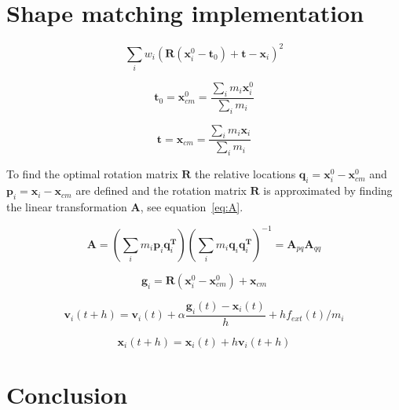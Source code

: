 \section{Shape matching implementation}

   
    \begin{equation} \label{eq:min}
        \sum_i{w_i(\mathbf{R}(\mathbf{x}_i^0 - \mathbf{t}_0) + \mathbf{t} - \mathbf{x}_i)^2}
    \end{equation}

    \begin{equation} \label{eq:com1}
        \mathbf{t}_0 = \mathbf{x}^0_{cm} = \frac{\sum_i{m_i\mathbf{x}_i^0}}{\sum_i{m_i}}
    \end{equation}

    \begin{equation} \label{eq:com2}
        \mathbf{t} = \mathbf{x}_{cm} = \frac{\sum_i{m_i\mathbf{x}_i}}{\sum_i{m_i}}
    \end{equation}

    To find the optimal rotation matrix $\mathbf{R}$ the relative locations 
    $\mathbf{q}_i = \mathbf{x}^0_i - \mathbf{x}^0_{cm}$ and 
    $\mathbf{p}_i = \mathbf{x}_i - \mathbf{x}_{cm}$ are defined and the rotation matrix 
    $\mathbf{R}$ is approximated by finding the linear transformation $\mathbf{A}$, see equation~\ref{eq:A}.

    \begin{equation} \label{eq:A}
        \mathbf{A} = (\sum_i{m_i\mathbf{p}_i\mathbf{q}_i^{\mathbf{T}}})
        (\sum_i{m_i\mathbf{q}_i\mathbf{q}_i^{\mathbf{T}}})^{-1} 
        = \mathbf{A}_{pq}\mathbf{A}_{qq}
    \end{equation}

    \begin{equation}\label{eq:goal}
        \mathbf{g}_i = \mathbf{R}(\mathbf{x}^0_i - \mathbf{x}^0_{cm}) + \mathbf{x}_{cm}
    \end{equation}

    \begin{equation} \label{eq:vel}
        \mathbf{v}_i(t + h) = \mathbf{v}_i(t) + \alpha{\frac{\mathbf{g}_i(t) - \mathbf{x}_i(t)}{h}} + hf_{ext}(t)/m_i
    \end{equation}

    \begin{equation} \label{eq:pos}
        \mathbf{x}_i(t + h) = \mathbf{x}_i(t) + h\mathbf{v}_i(t + h) 
    \end{equation}

\section{Conclusion}


\pagebreak



